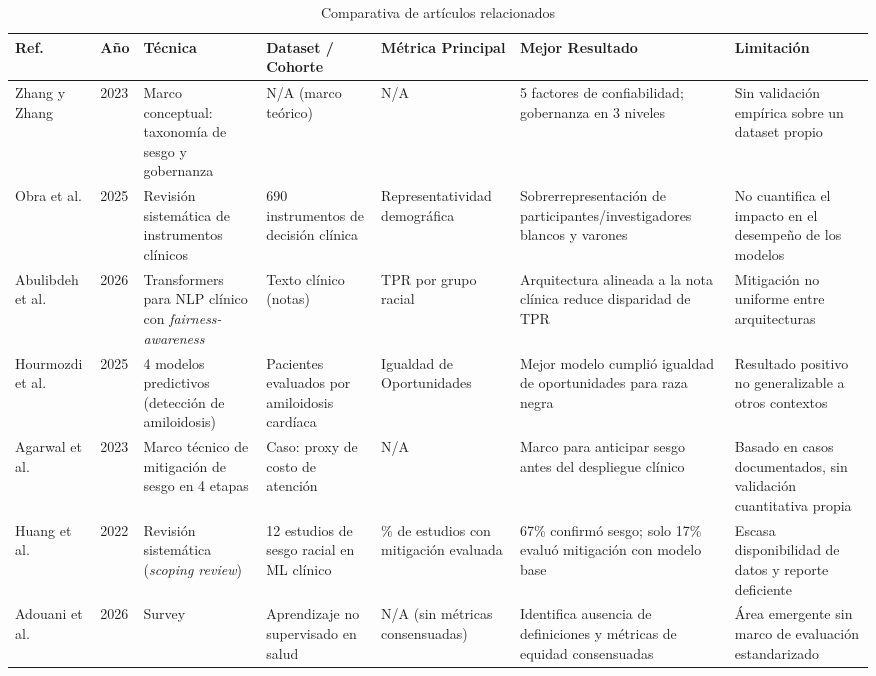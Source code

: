 \documentclass[conference]{IEEEtran}
\begin{document}
\begin{table}[t]
\centering
\caption{Comparativa de artículos relacionados}
\label{tab:comparativa}
\scriptsize
\renewcommand{\arraystretch}{0.92}
\begin{tabular}{@{}p{1.5cm}p{0.5cm}p{2.8cm}p{2.4cm}p{2.0cm}p{2.3cm}p{3.0cm}@{}}
\toprule
\textbf{Ref.} & \textbf{Año} & \textbf{Técnica} & \textbf{Dataset / Cohorte} & \textbf{Métrica Principal} & \textbf{Mejor Resultado} & \textbf{Limitación} \\
\midrule
Zhang y Zhang \cite{zhang2023ethics} & 2023 & Marco conceptual: taxonomía de sesgo y gobernanza & N/A (marco teórico) & N/A & 5 factores de confiabilidad; gobernanza en 3 niveles & Sin validación empírica sobre un dataset propio \\
Obra et al. \cite{obra2025potential} & 2025 & Revisión sistemática de instrumentos clínicos & 690 instrumentos de decisión clínica & Representatividad demográfica & Sobrerrepresentación de participantes/investigadores blancos y varones & No cuantifica el impacto en el desempeño de los modelos \\
Abulibdeh et al. \cite{abulibdeh2026integration} & 2026 & Transformers para NLP clínico con \textit{fairness-awareness} & Texto clínico (notas) & TPR por grupo racial & Arquitectura alineada a la nota clínica reduce disparidad de TPR & Mitigación no uniforme entre arquitecturas \\
Hourmozdi et al. \cite{hourmozdi2025evaluating} & 2025 & 4 modelos predictivos (detección de amiloidosis) & Pacientes evaluados por amiloidosis cardíaca & Igualdad de Oportunidades & Mejor modelo cumplió igualdad de oportunidades para raza negra & Resultado positivo no generalizable a otros contextos \\
Agarwal et al. \cite{agarwal2023addressing} & 2023 & Marco técnico de mitigación de sesgo en 4 etapas & Caso: proxy de costo de atención & N/A & Marco para anticipar sesgo antes del despliegue clínico & Basado en casos documentados, sin validación cuantitativa propia \\
Huang et al. \cite{huang2022evaluation} & 2022 & Revisión sistemática (\textit{scoping review}) & 12 estudios de sesgo racial en ML clínico & \% de estudios con mitigación evaluada & 67\% confirmó sesgo; solo 17\% evaluó mitigación con modelo base & Escasa disponibilidad de datos y reporte deficiente \\
Adouani et al. \cite{adouani2026rethinking} & 2026 & Survey & Aprendizaje no supervisado en salud & N/A (sin métricas consensuadas) & Identifica ausencia de definiciones y métricas de equidad consensuadas & Área emergente sin marco de evaluación estandarizado \\

\end{tabular}
\end{table}
\end{document}
